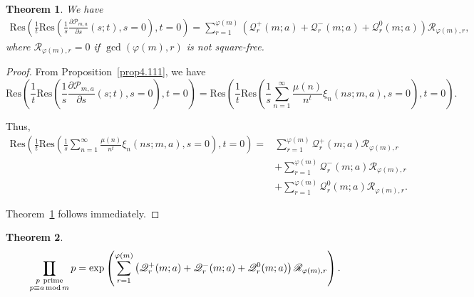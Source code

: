 \documentclass[12pt]{amsart}
\DeclareMathOperator*\Rprod{%
\mathchoice
  {\ooalign{$\displaystyle\prod$\cr\hidewidth$\displaystyle\coprod$\hidewidth\cr}}%
  {\ooalign{$\textstyle\prod$\cr\hidewidth$\textstyle\coprod$\hidewidth\cr}}%
  {\ooalign{$\scriptstyle\prod$\cr\hidewidth$\scriptstyle\coprod$\hidewidth\cr}}%
  {\ooalign{$\scriptscriptstyle\prod$\cr\hidewidth$%
  \scriptscriptstyle\coprod$\hidewidth\cr}}}
\newtheorem{theorem}{Theorem}[section]
\newcommand{\pt}{\partial}
\begin{document}
\begin{theorem}\label{mainThm1}
We have
\begin{equation*}
\begin{split}
\mathrm{Res}\left( \frac{1}{t} \mathrm{Res}\left( \frac{1}{s} \frac{\pt \mathcal{P}_{m,a}}{\pt s}(s; t), s=0 \right), t=0 \right)
= \sum_{r=1}^{\varphi(m)} \left( \mathscr{Q}_r^+(m; a) + \mathscr{Q}_r^-(m; a) + \mathscr{Q}_r^0(m; a) \right) \mathscr{R}_{\varphi(m), r},
\end{split}
\end{equation*}
where $\mathscr{R}_{\varphi(m), r} = 0$ if $\gcd(\varphi(m), r)$ is not square-free.
\end{theorem}

\begin{proof}
From Proposition~\ref{prop4.111}, we have
\begin{equation*}
\mathrm{Res}\left( \frac{1}{t} \mathrm{Res}\left( \frac{1}{s} \frac{\pt \mathcal{P}_{m,a}}{\pt s}(s; t), s=0 \right), t=0 \right)
= \mathrm{Res}\left( \frac{1}{t} \mathrm{Res}\left( \frac{1}{s} \sum_{n=1}^\infty \frac{\mu(n)}{n^t} \xi_n(ns; m, a), s=0 \right), t=0 \right).
\end{equation*}


Thus,
\begin{equation*}
\begin{split}
\mathrm{Res}\left( \frac{1}{t} \mathrm{Res}\left( \frac{1}{s} \sum_{n=1}^\infty \frac{\mu(n)}{n^t} \xi_n(ns; m, a), s=0 \right), t=0 \right)
= &\sum_{r=1}^{\varphi(m)} \mathscr{Q}_r^+(m; a) \mathscr{R}_{\varphi(m), r} \\
&+ \sum_{r=1}^{\varphi(m)} \mathscr{Q}_r^-(m; a) \mathscr{R}_{\varphi(m), r} \\
&+ \sum_{r=1}^{\varphi(m)} \mathscr{Q}_r^0(m; a) \mathscr{R}_{\varphi(m), r}.
\end{split}
\end{equation*}


Theorem~\ref{mainThm1} follows immediately.




\end{proof}


\begin{theorem}\label{pam}
\[
\Rprod_{\substack{p\ \text{prime} \\ p\equiv a\, \mathrm{mod}\, m}} p = 
\exp\left( \sum_{r=1}^{\varphi(m)} \left( \mathscr{Q}_r^+(m; a) + \mathscr{Q}_r^-(m; a) + \mathscr{Q}_r^0(m; a) \right) \mathscr{R}_{\varphi(m), r} \right).
\]
\end{theorem}
\end{document}
